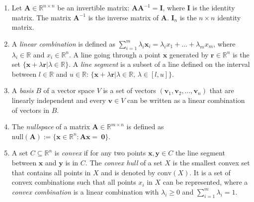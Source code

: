 \begin{enumerate}
    \item Let $\mathbf A \in \mathbb{R}^{n \times n}$ be an invertible matrix: $ \mathbf A \mathbf A^{-1} = \mathbf I$, where $\mathbf I$ is the identity matrix. The matrix $ \mathbf A^{-1}$ is the inverse matrix of $ \mathbf A$. %
    $\mathbf I_n$ is the $n \times n$ identity matrix.

    \item A \textit{linear combination} is defined as $\sum_{i=1}^{m} \lambda_i \mathbf x_i = 
    \lambda_i x_1 + ... + \lambda_m x_m$, where $\lambda_i \in \mathbb{R}$ and $x_i \in \mathbb{R}^n$.
    A line going through a point $\mathbf x$ generated by $\mathbf r \in \mathbb{R}^n$ is the set $\{\mathbf x + \lambda \mathbf r | \lambda \in \mathbb{R}\}$. A \textit{line segment} is a subset of a line defined on the interval between $l \in \mathbb{R}$ and $u \in \mathbb{R}$: $\{\mathbf x + \lambda \mathbf r | \lambda \in \mathbb{R}, \, \lambda \in [l, u ]\}$.

    \item A \textit{basis} $B$ of a vector space $V$ is a set of vectors $(\mathbf v_1, \mathbf v_2, ..., \mathbf v_n)$ that are linearly independent and every $\mathbf v \in V$ can be written as a linear combination of vectors in $B$.

    \item The \textit{nullspace} of a matrix $\mathbf A \in \mathbb{R}^{m \times n}$ is defined as $\text{null}(\mathbf A):=\{\mathbf x \in \mathbb{R}^n: \mathbf A \mathbf x = ~\mathbf0\}$. 
    \vspace*{-\baselineskip}
    
    \newpage
    \item A set $C \subseteq \mathbb{R}^n$ is \textit{convex} if for any two points $\mathbf x, \mathbf y \in C$ the line segment between $\mathbf x$ and $\mathbf y$ is in $C$. %
    The \textit{convex hull} of a set $X$ is the smallest convex set that contains all points in $X$ and is denoted by $\text{conv}(X)$. It is a set of convex combinations such that all points $x_i$ in $X$ can be represented, where a \textit{convex combination} is a linear combination with $\lambda_i \geq 0$ and $\sum_{i=1}^m \lambda_i = 1$.


\end{enumerate}
